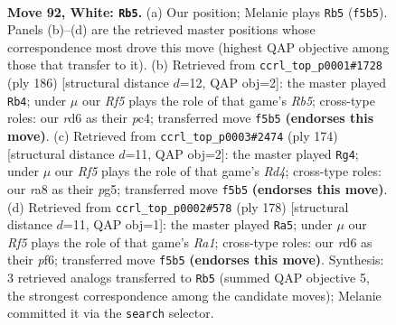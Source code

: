 \documentclass[11pt]{article}
\begin{document}
\clearpage

\begin{figure}[p]\centering
\begin{subfigure}{0.46\textwidth}\centering
\resizebox{\linewidth}{!}{%
\newchessgame
\chessboard[
  setfen={r7/2k5/3r4/5R2/6KP/8/8/8 w - - 25 92},
  showmover=false,
  pgfstyle=straightmove, color=movearrow, markmove={f5-b5}
]}
\caption{}
\end{subfigure}\hfill
\begin{subfigure}{0.46\textwidth}\centering
\resizebox{\linewidth}{!}{%
\newchessgame
\chessboard[
  setfen={3r4/8/2K2k2/1R6/2p3P1/8/8/8 w - - 11 94},
  showmover=false,
  pgfstyle=straightmove, color=movearrow, markmove={b5-b4}
]}
\caption{}
\end{subfigure}
\\[4pt]
\begin{subfigure}{0.46\textwidth}\centering
\resizebox{\linewidth}{!}{%
\newchessgame
\chessboard[
  setfen={8/8/5k2/6p1/3R4/4KP2/r7/8 w - - 12 88},
  showmover=false,
  pgfstyle=straightmove, color=movearrow, markmove={d4-g4}
]}
\caption{}
\end{subfigure}\hfill
\begin{subfigure}{0.46\textwidth}\centering
\resizebox{\linewidth}{!}{%
\newchessgame
\chessboard[
  setfen={5k2/1r6/5p2/8/6P1/6K1/8/R7 w - - 12 90},
  showmover=false,
  pgfstyle=straightmove, color=movearrow, markmove={a1-a5}
]}
\caption{}
\end{subfigure}
\caption{\textbf{Move 92, White: \texttt{Rb5}.} (a) Our position; Melanie plays \texttt{Rb5} (\texttt{f5b5}). Panels (b)--(d) are the retrieved master positions whose correspondence most drove this move (highest QAP objective among those that transfer to it). (b) Retrieved from \texttt{ccrl\_top\_p0001\#1728} (ply 186) [structural distance $d$=12, QAP obj=2]: the master played \texttt{Rb4}; under $\mu$ our \emph{Rf5} plays the role of that game's \emph{Rb5}; cross-type roles: our \emph{r}d6 as their \emph{p}c4; transferred move \texttt{f5b5} \textbf{(endorses this move)}. (c) Retrieved from \texttt{ccrl\_top\_p0003\#2474} (ply 174) [structural distance $d$=11, QAP obj=2]: the master played \texttt{Rg4}; under $\mu$ our \emph{Rf5} plays the role of that game's \emph{Rd4}; cross-type roles: our \emph{r}a8 as their \emph{p}g5; transferred move \texttt{f5b5} \textbf{(endorses this move)}. (d) Retrieved from \texttt{ccrl\_top\_p0002\#578} (ply 178) [structural distance $d$=11, QAP obj=1]: the master played \texttt{Ra5}; under $\mu$ our \emph{Rf5} plays the role of that game's \emph{Ra1}; cross-type roles: our \emph{r}d6 as their \emph{p}f6; transferred move \texttt{f5b5} \textbf{(endorses this move)}. Synthesis: 3 retrieved analogs transferred to \texttt{Rb5} (summed QAP objective 5, the strongest correspondence among the candidate moves); Melanie committed it via the \texttt{search} selector.}
\label{fig:thought-m182}
\end{figure}
\end{document}
